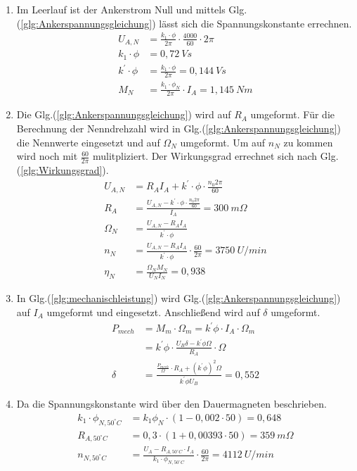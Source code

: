 \begin{solution}
\begin{enumerate}
\item Im Leerlauf ist der Ankerstrom Null und mittels Glg.(\ref{glg:Ankerspannungsgleichung}) l\"asst sich die Spannungskonstante errechnen.
\begin{align}
U_{A,N} &= \frac{k_1 \cdot \phi}{2 \pi} \cdot \frac{4000}{60} \cdot 2 \pi\\
k_1 \cdot \phi &= 0,72~Vs\\
k^{'} \cdot \phi &= \frac{k_1 \cdot \phi}{2 \pi} = 0,144~Vs\\
M_N &= \frac{k_1 \cdot \phi_N}{2 \pi} \cdot I_A = 1,145~Nm
\end{align}
\item Die Glg.(\ref{glg:Ankerspannungsgleichung}) wird auf $R_A$ umgeformt. F\"ur die Berechnung der Nenndrehzahl wird in Glg.(\ref{glg:Ankerspannungsgleichung}) die Nennwerte eingesetzt und auf $\Omega_N$ umgeformt. Um auf $n_N$ zu kommen wird noch mit $\frac{60}{2 \pi}$ mulitpliziert. Der Wirkungsgrad errechnet sich nach Glg.(\ref{glg:Wirkungsgrad}).
\begin{align}
U_{A,N} &= R_A I_A + k^{'}\cdot \phi \cdot \frac{n_0 2 \pi}{60}\\
R_A &= \frac{U_{A,N} -k^{'}\cdot \phi \cdot \frac{n_0 2 \pi}{60}}{I_A} = 300~m\Omega\\
\Omega_N &= \frac{U_{A,N} - R_A I_A}{k^{'}\cdot \phi}\\
n_N &= \frac{U_{A,N} - R_A I_A}{k^{'}\cdot \phi} \cdot \frac{60}{2 \pi} = 3750 ~U /min\\
\eta_N &= \frac{\Omega_N M_N}{U_N I_N} = 0,938
\end{align}
\item In Glg.(\ref{glg:mechanischleistung}) wird Glg.(\ref{glg:Ankerspannungsgleichung}) auf $I_A$ umgeformt und eingesetzt. Anschließend wird auf $\delta$ umgeformt.
\begin{align}
P_{mech} &=M_m \cdot \Omega_m = k^{'} \phi \cdot I_A \cdot \Omega_m\\
&= k^{'} \phi \cdot \frac{U_B \delta - k^{'} \phi \Omega}{R_A} \cdot \Omega\\
\delta &= \frac{\frac{P_{mech}}{\Omega} \cdot R_A + (k^{'} \phi)^2 \Omega}{k^{'} \phi U_B}=0,552
\end{align}
\item Da die Spannungskonstante wird \"uber den Dauermagneten beschrieben.
\begin{align}
k_1 \cdot \phi_{N,50^\circ C}&= k_1 \phi_N \cdot (1 - 0,002 \cdot 50)= 0,648\\
R_{A,50^\circ C} &= 0,3 \cdot (1+ 0,00393 \cdot 50) = 359~m\Omega\\
n_{N,50^\circ C} &= \frac{U_A -R_{A,50^\circ C} \cdot I_A}{k_1 \cdot \phi_{N,50^\circ C}}\cdot \frac{60}{2 \pi} = 4112 ~U/min
\end{align}
\end{enumerate}
\end{solution}
